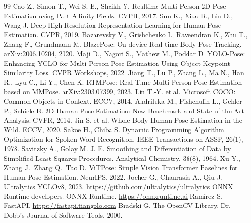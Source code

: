 \begin{thebibliography}{99}
	Cao Z., Simon T., Wei S.-E., Sheikh Y. Realtime Multi-Person 2D Pose Estimation using Part Affinity Fields. CVPR, 2017.
	Sun K., Xiao B., Liu D., Wang J. Deep High-Resolution Representation Learning for Human Pose Estimation. CVPR, 2019.
	Bazarevsky V., Grishchenko I., Raveendran K., Zhu T., Zhang F., Grundmann M. BlazePose: On-device Real-time Body Pose Tracking. arXiv:2006.10204, 2020.
	Maji D., Nagori S., Mathew M., Poddar D. YOLO-Pose: Enhancing YOLO for Multi Person Pose Estimation Using Object Keypoint Similarity Loss. CVPR Workshops, 2022.
	Jiang T., Lu P., Zhang L., Ma N., Han R., Lyu C., Li Y., Chen K. RTMPose: Real-Time Multi-Person Pose Estimation based on MMPose. arXiv:2303.07399, 2023.
	Lin T.-Y. et al. Microsoft COCO: Common Objects in Context. ECCV, 2014.
	Andriluka M., Pishchulin L., Gehler P., Schiele B. 2D Human Pose Estimation: New Benchmark and State of the Art Analysis. CVPR, 2014.
	Jin S. et al. Whole-Body Human Pose Estimation in the Wild. ECCV, 2020.
	Sakoe H., Chiba S. Dynamic Programming Algorithm Optimization for Spoken Word Recognition. IEEE Transactions on ASSP, 26(1), 1978.
	Savitzky A., Golay M. J. E. Smoothing and Differentiation of Data by Simplified Least Squares Procedures. Analytical Chemistry, 36(8), 1964.
	Xu Y., Zhang J., Zhang Q., Tao D. ViTPose: Simple Vision Transformer Baselines for Human Pose Estimation. NeurIPS, 2022.
	Jocher G., Chaurasia A., Qiu J. Ultralytics YOLOv8, 2023. \url{https://github.com/ultralytics/ultralytics}
	ONNX Runtime developers. ONNX Runtime. \url{https://onnxruntime.ai}
	Ramírez S. FastAPI. \url{https://fastapi.tiangolo.com}
	Bradski G. The OpenCV Library. Dr. Dobb's Journal of Software Tools, 2000.
\end{thebibliography}
